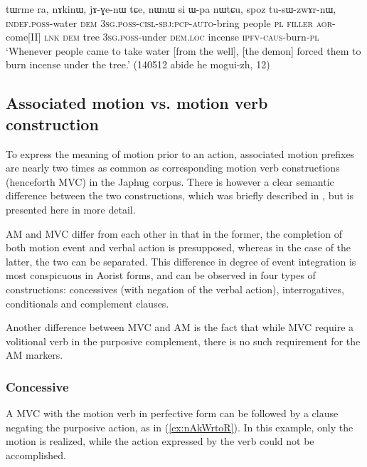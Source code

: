 \begin{exe}
\ex \label{ex:tWci.WGWkWnWru}
\gll [tɯ-ci nɯnɯ ɯ-ɣɯ-kɯ-nɯ-ru] tɯrme ra, nɤkinɯ, jɤ-ɣe-nɯ tɕe, nɯnɯ si ɯ-pa nɯtɕu, spoz tu-sɯ-zwɤr-nɯ, \\
\textsc{indef}.\textsc{poss}-water \textsc{dem} \textsc{3sg}.\textsc{poss}-\textsc{cisl}-\textsc{sbj}:\textsc{pcp}-\textsc{auto}-bring people \textsc{pl} \textsc{filler} \textsc{aor}-come[II] \textsc{lnk} \textsc{dem} tree \textsc{3sg}.\textsc{poss}-under \textsc{dem}.\textsc{loc} incense \textsc{ipfv}-\textsc{caus}-burn-\textsc{pl} \\
\glt `Whenever people came to take water [from the well], [the demon] forced them to burn incense under the tree.' (140512 abide he mogui-zh, 12)
\end{exe}

\subsection{Associated motion vs. motion verb construction} \label{sec:am.vs.mvc}
To express the meaning of motion prior to an action, associated motion prefixes are nearly two times as common as corresponding motion verb constructions (henceforth MVC) in the Japhug corpus. There is however a clear semantic difference between the two constructions, which was briefly described in \citet{jacques13harmonization}, but is presented here in more detail.

AM and MVC differ from each other in that in the former, the completion of both motion event and verbal action is presupposed, whereas in the case of the latter, the two can be separated. This difference in degree of event integration is most conspicuous in Aorist forms, and can be observed in four types of constructions: concessives (with negation of the verbal action), interrogatives, conditionals and complement clauses. 

Another difference between MVC and AM is the fact that while MVC require a volitional verb in the purposive complement, there is no such requirement for the AM markers.

\subsubsection{Concessive} \label{sec:am.concessive}
A MVC  with the motion verb in perfective form can be followed by a clause negating the purposive action, as in (\ref{ex:nAkWrtoR}). In this example, only the motion is realized, while the action expressed by the verb  could not be accomplished.


